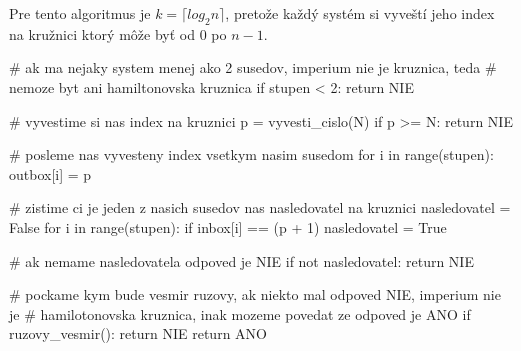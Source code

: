 \documentclass[10pt]{article}
\begin{document}
Pre tento algoritmus je $k=\lceil log_2 n \rceil$, pretože každý systém si
vyveští jeho index na kružnici ktorý môže byť od $0$ po $n-1$.

\begin{python}
# ak ma nejaky system menej ako 2 susedov, imperium nie je kruznica, teda
# nemoze byt ani hamiltonovska kruznica
if stupen < 2: return NIE

# vyvestime si nas index na kruznici
p = vyvesti_cislo(N)
if p >= N: return NIE

# posleme nas vyvesteny index vsetkym nasim susedom
for i in range(stupen):
    outbox[i] = p

# zistime ci je jeden z nasich susedov nas nasledovatel na kruznici
nasledovatel = False
for i in range(stupen):
    if inbox[i] == (p + 1) %
        nasledovatel = True

# ak nemame nasledovatela odpoved je NIE 
if not nasledovatel: return NIE

# pockame kym bude vesmir ruzovy, ak niekto mal odpoved NIE, imperium nie je
# hamilotonovska kruznica, inak mozeme povedat ze odpoved je ANO
if ruzovy_vesmir(): return NIE
return ANO


\end{python}
\end{document}
